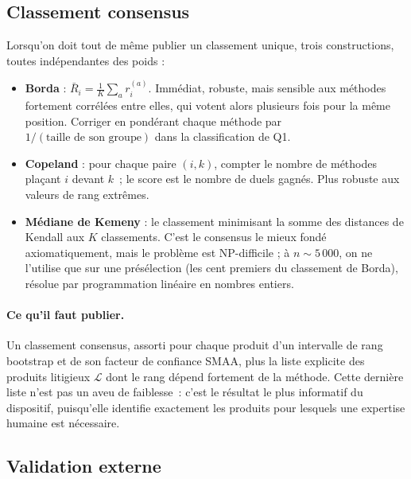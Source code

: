 \documentclass[11pt,a4paper]{article}
\theoremstyle{definition}
\theoremstyle{remark}
\begin{document}
\bigskip

\subsection{Classement consensus}

Lorsqu'on doit tout de même publier un classement unique, trois constructions, toutes
indépendantes des poids :

\medskip

\begin{itemize}[leftmargin=1.4em,itemsep=2pt]
  \item \textbf{Borda} : $\bar{R}_i = \frac{1}{K}\sum_a r^{(a)}_i$. Immédiat, robuste, mais
  sensible aux méthodes fortement corrélées entre elles, qui votent alors plusieurs fois pour la
  même position. Corriger en pondérant chaque méthode par $1/(\text{taille de son groupe})$ dans
  la classification de Q1.
  \item \textbf{Copeland} : pour chaque paire $(i,k)$, compter le nombre de méthodes plaçant $i$
  devant $k$~; le score est le nombre de duels gagnés. Plus robuste aux valeurs de rang extrêmes.
  \item \textbf{Médiane de Kemeny} : le classement minimisant la somme des distances de Kendall aux
  $K$ classements. C'est le consensus le mieux fondé axiomatiquement, mais le problème est
  NP-difficile ; à $n \sim 5\,000$, on ne l'utilise que sur une présélection (les cent premiers du
  classement de Borda), résolue par programmation linéaire en nombres entiers.
\end{itemize}

\bigskip

\paragraph{Ce qu'il faut publier.} Un classement consensus, assorti pour chaque produit d'un
intervalle de rang bootstrap et de son facteur de confiance SMAA, plus la liste explicite des
produits litigieux $\mathcal{L}$ dont le rang dépend fortement de la méthode. Cette dernière liste
n'est pas un aveu de faiblesse~: c'est le résultat le plus informatif du dispositif, puisqu'elle
identifie exactement les produits pour lesquels une expertise humaine est nécessaire.

\bigskip

\subsection{Validation externe}
\end{document}
